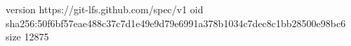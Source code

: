 version https://git-lfs.github.com/spec/v1
oid sha256:50f6bf57eae488c37c7d1e49e9d79e6991a378b1034c7dec8c1bb28500e98bc6
size 12875
